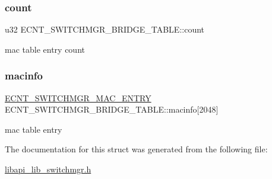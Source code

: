 \subsubsection{\texorpdfstring{count}{count}}
{\footnotesize\ttfamily u32 E\+C\+N\+T\+\_\+\+S\+W\+I\+T\+C\+H\+M\+G\+R\+\_\+\+B\+R\+I\+D\+G\+E\+\_\+\+T\+A\+B\+L\+E\+::count}

mac table entry count \mbox{\label{structECNT__SWITCHMGR__BRIDGE__TABLE_a365c6290dd319aa8a2e005a2d3fcf2ae}} 
\subsubsection{\texorpdfstring{macinfo}{macinfo}}
{\footnotesize\ttfamily \hyperlink{structECNT__SWITCHMGR__MAC__ENTRY}{E\+C\+N\+T\+\_\+\+S\+W\+I\+T\+C\+H\+M\+G\+R\+\_\+\+M\+A\+C\+\_\+\+E\+N\+T\+RY} E\+C\+N\+T\+\_\+\+S\+W\+I\+T\+C\+H\+M\+G\+R\+\_\+\+B\+R\+I\+D\+G\+E\+\_\+\+T\+A\+B\+L\+E\+::macinfo\mbox{[}2048\mbox{]}}

mac table entry 

The documentation for this struct was generated from the following file\+:\begin{DoxyCompactItemize}
\item 
\hyperlink{libapi__lib__switchmgr_8h}{libapi\+\_\+lib\+\_\+switchmgr.\+h}\end{DoxyCompactItemize}
